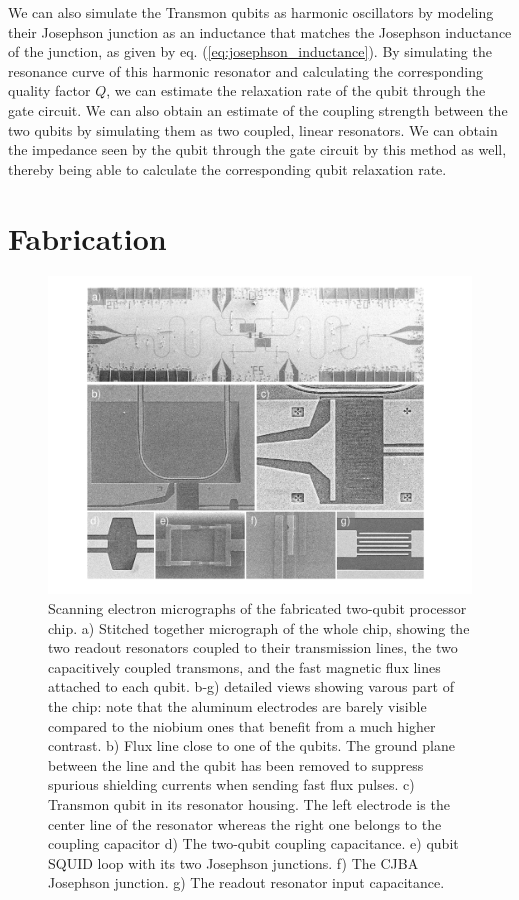 \smallskip


We can also simulate the Transmon qubits as harmonic oscillators by modeling their Josephson junction as an inductance that matches the Josephson inductance of the junction, as given by eq. (\ref{eq:josephson_inductance}). By simulating the resonance curve of this harmonic resonator and calculating the corresponding quality factor $Q$, we can estimate the relaxation rate of the qubit through the gate circuit. We can also obtain an estimate of the coupling strength between the two qubits by simulating them as two coupled, linear resonators. We can obtain the impedance seen by the qubit through the gate circuit by this method as well, thereby being able to calculate the corresponding qubit relaxation rate.

\section{Fabrication}

\begin{figure}[p!]
	\includegraphics[width=1\textwidth]{"./material/figures/2-qubit-processor/processor photos"}
	\caption{Scanning electron micrographs of the fabricated two-qubit processor chip. a) Stitched together micrograph of the whole chip, showing the two readout resonators coupled to their transmission lines, the two capacitively coupled transmons, and the fast magnetic flux lines attached to each qubit. b-g) detailed views showing varous part of the chip: note that the aluminum electrodes are barely visible compared to the niobium ones that benefit from a much higher contrast. b) Flux line close to one of the qubits. The ground plane between the line and the qubit has been removed to suppress spurious shielding currents when sending fast flux pulses. c) Transmon qubit in its resonator housing. The left electrode is the center line of the resonator whereas the right one belongs to the coupling capacitor d) The two-qubit coupling capacitance. e) qubit SQUID loop with its two Josephson junctions. f) The CJBA Josephson junction. g) The readout resonator input capacitance.}
	\label{fig:qubit_chip_photos}
\end{figure}

